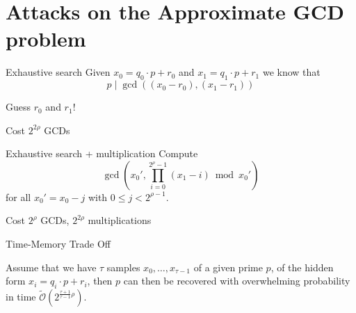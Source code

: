 \documentclass[presentation,smaller]{beamer}
\begin{document}
\section{Attacks on the Approximate GCD problem}
\label{sec:org7472cbe}

\begin{frame}[label={sec:org810e709}]{Exhaustive search}
Given \(x_0 = q_0 ⋅ p + r_0\) and \(x_1 = q_1 ⋅ p + r_1\) we know that \[p \mid \gcd\left((x_0 - r_0), (x_1 - r_1)\right)\]


Guess \(r_0\) and \(r_1\)!

\begin{block}{Cost}
\(2^{2ρ}\) GCDs
\end{block}
\end{frame}

\begin{frame}[label={sec:org456c381}]{Exhaustive search + multiplication}
Compute \[\gcd\left(x_0', \prod_{i=0}^{2^ρ-1} (x_1 - i) \bmod x_0'\right)\] for all \(x_0' = x_0 - j\) with \(0 \leq j < 2^{ρ-1}\).

\begin{block}{Cost}
\(2^ρ\) GCDs, \(2^{2ρ}\) multiplications
\end{block}
\end{frame}

\begin{frame}[label={sec:org879bf7c}]{Time-Memory Trade Off}
\begin{lemma}
Assume that we have \(τ\) samples \(x_0 , … ,x_{τ-1}\) of a given prime \(p\), of the hidden form \(x_i = q_i ⋅ p + r_i\), then \(p\) can then be recovered with overwhelming probability in time \(\tilde{\mathcal{O}}(2^{\frac{τ+1}{τ-1}ρ})\). 
\end{lemma}
\end{frame}
\end{document}
